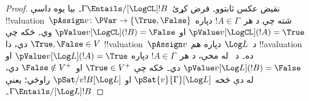\documentclass[../../../include/open-logic-section]{subfiles}
\begin{document}
\begin{proof}
  نقيض عکس ثابتوو۔ فرض کړئ~$\Gamma \Entails/[\LogCL] !B$۔
  بيا يوه داسې !!{valuation}~$\pAssign v\colon \PVar \to
  \{\True, \False\}$ شته چې د هر~$!A \in \Gamma$ دپاره
  $\pValue v[\LogCL](!A) = \True$ او
  $\pValue v[\LogCL](!B) = \False$ وي۔ ځکه چې
  $\True, \False \in V$ دي، دا !!{valuation}~$\pAssign v$
  د~$\Log L$ دپاره هم !!a{valuation} ده۔ د~
  له مخې، د هر~$!A \in \Gamma$ دپاره
  $\pValue v[\Log L](!A) = \True$ او
  $\pValue v[\Log L](!B) = \False$ دي۔ ځکه چې
  $\True \in V^+$ او~$\False \notin V^+$ دي، له دې څخه
  $\pSat{v}{\Gamma}[\Log L]$ او
  $\pSat/{v}{!B}[\Log L]$ راوځي؛ يعنې
  $\Gamma \Entails/[\Log L] !B$۔
\end{proof}
\end{document}
